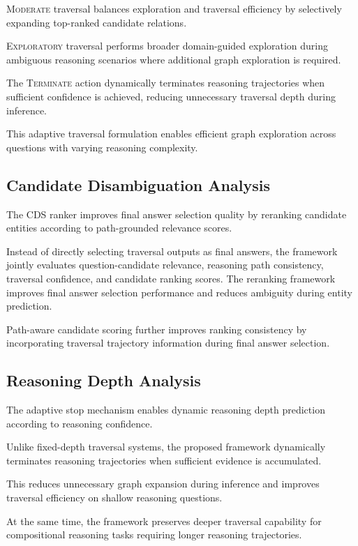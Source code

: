 \documentclass[10pt,conference]{IEEEtran}
\begin{document}
\textsc{Moderate} traversal balances exploration and traversal efficiency by selectively expanding top-ranked candidate relations.

\textsc{Exploratory} traversal performs broader domain-guided exploration during ambiguous reasoning scenarios where additional graph exploration is required.

The \textsc{Terminate} action dynamically terminates reasoning trajectories when sufficient confidence is achieved, reducing unnecessary traversal depth during inference.

This adaptive traversal formulation enables efficient graph exploration across questions with varying reasoning complexity.

\subsection{Candidate Disambiguation Analysis}

The CDS ranker improves final answer selection quality by reranking candidate entities according to path-grounded relevance scores.

Instead of directly selecting traversal outputs as final answers, the framework jointly evaluates question-candidate relevance, reasoning path consistency, traversal confidence, and candidate ranking scores. The reranking framework improves final answer selection performance and reduces ambiguity during entity prediction.

Path-aware candidate scoring further improves ranking consistency by incorporating traversal trajectory information during final answer selection.

\subsection{Reasoning Depth Analysis}

The adaptive stop mechanism enables dynamic reasoning depth prediction according to reasoning confidence.

Unlike fixed-depth traversal systems, the proposed framework dynamically terminates reasoning trajectories when sufficient evidence is accumulated.

This reduces unnecessary graph expansion during inference and improves traversal efficiency on shallow reasoning questions.

At the same time, the framework preserves deeper traversal capability for compositional reasoning tasks requiring longer reasoning trajectories.
\end{document}

